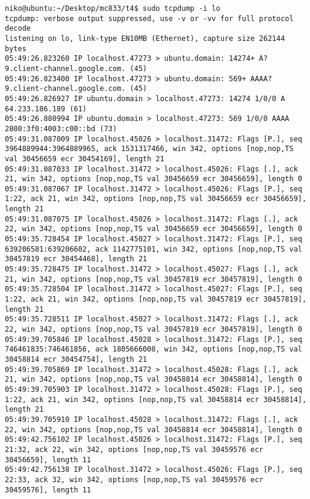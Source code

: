\documentclass[a4paper,10pt]{article}
\begin{document}
\begin{lstlisting}
niko@ubuntu:~/Desktop/mc833/t4$ sudo tcpdump -i lo
tcpdump: verbose output suppressed, use -v or -vv for full protocol decode
listening on lo, link-type EN10MB (Ethernet), capture size 262144 bytes
05:49:26.823260 IP localhost.47273 > ubuntu.domain: 14274+ A? 9.client-channel.google.com. (45)
05:49:26.823400 IP localhost.47273 > ubuntu.domain: 569+ AAAA? 9.client-channel.google.com. (45)
05:49:26.826927 IP ubuntu.domain > localhost.47273: 14274 1/0/0 A 64.233.186.189 (61)
05:49:26.880994 IP ubuntu.domain > localhost.47273: 569 1/0/0 AAAA 2800:3f0:4003:c00::bd (73)
05:49:31.087009 IP localhost.45026 > localhost.31472: Flags [P.], seq 3964889944:3964889965, ack 1531317466, win 342, options [nop,nop,TS val 30456659 ecr 30454169], length 21
05:49:31.087033 IP localhost.31472 > localhost.45026: Flags [.], ack 21, win 342, options [nop,nop,TS val 30456659 ecr 30456659], length 0
05:49:31.087067 IP localhost.31472 > localhost.45026: Flags [P.], seq 1:22, ack 21, win 342, options [nop,nop,TS val 30456659 ecr 30456659], length 21
05:49:31.087075 IP localhost.45026 > localhost.31472: Flags [.], ack 22, win 342, options [nop,nop,TS val 30456659 ecr 30456659], length 0
05:49:35.728454 IP localhost.45027 > localhost.31472: Flags [P.], seq 639206581:639206602, ack 1142775101, win 342, options [nop,nop,TS val 30457819 ecr 30454468], length 21
05:49:35.728475 IP localhost.31472 > localhost.45027: Flags [.], ack 21, win 342, options [nop,nop,TS val 30457819 ecr 30457819], length 0
05:49:35.728504 IP localhost.31472 > localhost.45027: Flags [P.], seq 1:22, ack 21, win 342, options [nop,nop,TS val 30457819 ecr 30457819], length 21
05:49:35.728511 IP localhost.45027 > localhost.31472: Flags [.], ack 22, win 342, options [nop,nop,TS val 30457819 ecr 30457819], length 0
05:49:39.705846 IP localhost.45028 > localhost.31472: Flags [P.], seq 746461835:746461856, ack 1805666008, win 342, options [nop,nop,TS val 30458814 ecr 30454754], length 21
05:49:39.705869 IP localhost.31472 > localhost.45028: Flags [.], ack 21, win 342, options [nop,nop,TS val 30458814 ecr 30458814], length 0
05:49:39.705903 IP localhost.31472 > localhost.45028: Flags [P.], seq 1:22, ack 21, win 342, options [nop,nop,TS val 30458814 ecr 30458814], length 21
05:49:39.705910 IP localhost.45028 > localhost.31472: Flags [.], ack 22, win 342, options [nop,nop,TS val 30458814 ecr 30458814], length 0
05:49:42.756102 IP localhost.45026 > localhost.31472: Flags [P.], seq 21:32, ack 22, win 342, options [nop,nop,TS val 30459576 ecr 30456659], length 11
05:49:42.756138 IP localhost.31472 > localhost.45026: Flags [P.], seq 22:33, ack 32, win 342, options [nop,nop,TS val 30459576 ecr 30459576], length 11

\end{lstlisting}
\end{document}
